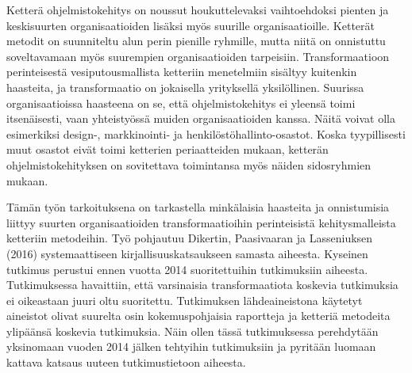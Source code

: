 Ketterä ohjelmistokehitys on noussut houkuttelevaksi vaihtoehdoksi
pienten ja keskisuurten organisaatioiden lisäksi myös suurille
organisaatioille. Ketterät metodit on suunniteltu alun perin
pienille ryhmille, mutta niitä on onnistuttu soveltavamaan myös
suurempien organisaatioiden tarpeisiin. Transformaatioon perinteisestä
vesiputousmallista ketteriin menetelmiin sisältyy kuitenkin haasteita,
ja transformaatio on jokaisella yrityksellä yksilöllinen. Suurissa
organisaatioissa haasteena on se, että ohjelmistokehitys ei yleensä
toimi itsenäisesti, vaan yhteistyössä muiden organisaatioiden
kanssa. Näitä voivat olla esimerkiksi design-, markkinointi- ja
henkilöstöhallinto-osastot. Koska tyypillisesti muut osastot eivät
toimi ketterien periaatteiden mukaan, ketterän ohjelmistokehityksen on
sovitettava toimintansa myös näiden sidosryhmien mukaan.

Tämän työn tarkoituksena on tarkastella minkälaisia haasteita
ja onnistumisia liittyy suurten organisaatioiden transformaatioihin
perinteisistä kehitysmalleista ketteriin metodeihin. Työ pohjautuu
Dikertin, Paasivaaran ja Lasseniuksen (2016) systemaattiseen
kirjallisuuskatsaukseen samasta aiheesta. Kyseinen tutkimus perustui 
ennen vuotta 2014 suoritettuihin tutkimuksiin aiheesta. Tutkimuksessa
havaittiin, että varsinaisia transformaatiota koskevia tutkimuksia
ei oikeastaan juuri oltu suoritettu. Tutkimuksen lähdeaineistona
käytetyt aineistot olivat suurelta osin kokemuspohjaisia raportteja
ja ketteriä metodeita ylipäänsä koskevia tutkimuksia. Näin ollen
tässä tutkimuksessa perehdytään yksinomaan vuoden 2014 jälken
tehtyihin tutkimuksiin ja pyritään luomaan kattava katsaus uuteen
tutkimustietoon aiheesta.

